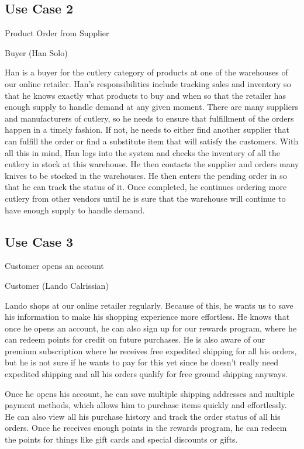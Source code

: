 \subsection{Use Case 2}
\begin{description}[font=\bfseries\itshape]
\item[Title:]Product Order from Supplier
\item[Actors:]Buyer (Han Solo)
\item[Description:]Han is a buyer for the cutlery category of products at one of the warehouses of our online retailer.  Han's responsibilities include tracking sales and inventory so that he knows exactly what products to buy and when so that the retailer has enough supply to handle demand at any given moment.  There are many suppliers and manufacturers of cutlery, so he needs to ensure that fulfillment of the orders happen in a timely fashion.  If not, he needs to either find another supplier that can fulfill the order or find a substitute item that will satisfy the customers.  With all this in mind, Han logs into the system and checks the inventory of all the cutlery in stock at this warehouse.  He then contacts the supplier and orders many knives to be stocked in the warehouses.  He then enters the pending order in so that he can track the status of it.  Once completed, he continues ordering more cutlery from other vendors until he is sure that the warehouse will continue to have enough supply to handle demand.
\end{description}

\subsection{Use Case 3}
\begin{description}[font=\bfseries\itshape]
\item[Title:]Customer opens an account
\item[Actors:]Customer (Lando Calrissian)
\item[Description:]Lando shops at our online retailer regularly.  Because of this, he wants us to save his information to make his shopping experience more effortless.  He knows that once he opens an account, he can also sign up for our rewards program, where he can redeem points for credit on future purchases.  He is also aware of our premium subscription where he receives free expedited shipping for all his orders, but he is not sure if he wants to pay for this yet since he doesn't really need expedited shipping and all his orders qualify for free ground shipping anyways.

\hspace*{2em}Once he opens his account, he can save multiple shipping addresses and multiple payment methods, which allows him to purchase items quickly and effortlessly. He can also view all his purchase history and track the order status of all his orders.  Once he receives enough points in the rewards program, he can redeem the points for things like gift cards and special discounts or gifts.
\end{description}

